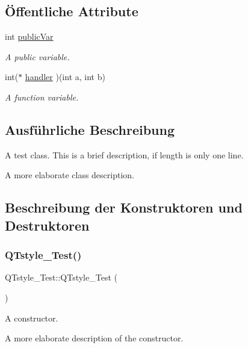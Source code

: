 \subsection*{Öffentliche Attribute}
\begin{DoxyCompactItemize}
\item 
int \hyperlink{class_q_tstyle___test_aabf7b2e9ed83ea44aca4d213baae06d3}{public\+Var}
\begin{DoxyCompactList}\small\item\em A public variable. \end{DoxyCompactList}\item 
int($\ast$ \hyperlink{class_q_tstyle___test_a79dd4e5498f09057775a819d911349e2}{handler} )(int a, int b)
\begin{DoxyCompactList}\small\item\em A function variable. \end{DoxyCompactList}\end{DoxyCompactItemize}


\subsection{Ausführliche Beschreibung}
A test class. This is a brief description, if length is only one line. 

A more elaborate class description. 

\subsection{Beschreibung der Konstruktoren und Destruktoren}
\mbox{\label{class_q_tstyle___test_a14a296ea4e2ad446712f2310bec60766}} 
\subsubsection{\texorpdfstring{Q\+Tstyle\+\_\+\+Test()}{QTstyle\_Test()}}
{\footnotesize\ttfamily Q\+Tstyle\+\_\+\+Test\+::\+Q\+Tstyle\+\_\+\+Test (\begin{DoxyParamCaption}{ }\end{DoxyParamCaption})}



A constructor. 

A more elaborate description of the constructor. \mbox{\label{class_q_tstyle___test_a0ad2e372fe09f34fce46b570b297ae79}} 
